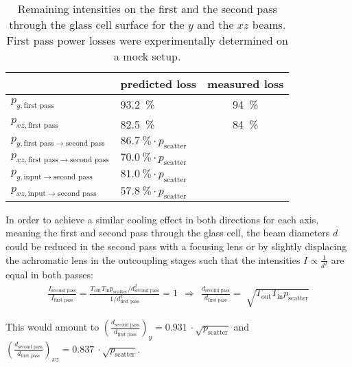 \begin{table}
    \centering
    \begin{tabular}{llc}
        \toprule
        & \textbf{predicted loss} & \textbf{measured loss} \\
        \toprule
        $p_{y, \text{first pass}}$ & \SI{93.2}{\percent} & \SI{94}{\percent} \\
        $p_{xz, \text{first pass}}$ & \SI{82.5}{\percent} & \SI{84}{\percent} \\
        \midrule
        $p_{y, \text{first pass} \rightarrow \text{second pass}}$ & $\SI{86.7}{\percent} \cdot p_\text{scatter}$ & \\
        $p_{xz, \text{first pass} \rightarrow \text{second pass}}$ & $\SI{70.0}{\percent} \cdot p_\text{scatter}$ & \\
        \midrule
        $p_{y, \text{input} \rightarrow \text{second pass}}$ & $\SI{81.0}{\percent} \cdot p_\text{scatter}$ & \\
        $p_{xz, \text{input} \rightarrow \text{second pass}}$ & $\SI{57.8}{\percent} \cdot p_\text{scatter}$ & \\
        \bottomrule
    \end{tabular}
    \caption{Remaining intensities on the first and the second pass through the glass cell surface for the $y$ and the $xz$ beams. First pass power losses were experimentally determined on a mock setup.}
    \label{tab:intensity_losses}
\end{table}

In order to achieve a similar cooling effect in both directions for each axis, meaning the first and second pass through the glass cell, the beam diameters $d$ could be reduced in the second pass with a focusing lens or by slightly displacing the achromatic lens in the outcoupling stages such that the intensities $I \propto \frac{1}{d^2}$ are equal in both passes:
\begin{align}\label{eq:intensity_focusing}
\frac{I_\text{second pass}}{I_\text{first pass}} =  \frac{T_\text{out} T_\text{in} p_\text{scatter} / d^2_\text{second pass}}{1/ d^2_\text{first pass}} = 1 ~~\Rightarrow~~ \frac{d_\text{second pass}}{d_\text{first pass}} = \sqrt[]{T_\text{out} T_\text{in} p_\text{scatter}}
\end{align}

This would amount to $\left(\frac{d_\text{second pass}}{d_\text{first pass}}\right)_y = \SI[]{0.931}{} \cdot \sqrt{p_\text{scatter}}$ and $\left(\frac{d_\text{second pass}}{d_\text{first pass}}\right)_{xz} = \SI[]{0.837}{} \cdot \sqrt{p_\text{scatter}}$.

